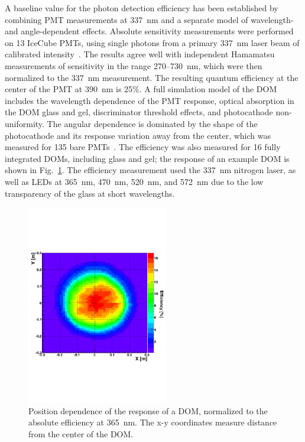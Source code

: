 A baseline value for the photon detection efficiency has been established
by combining PMT measurements at 337~nm and a separate model of wavelength-
and angle-dependent effects.  Absolute sensitivity measurements were
performed on 13 IceCube PMTs, using single photons from a primary 337~nm laser beam of calibrated
intensity~\cite{ICECUBE:PMT}. The results agree well with independent
Hamamatsu measurements of sensitivity in the range 270--730~nm, which
were then normalized to the 337~nm measurement.  The resulting quantum
efficiency at the center of the PMT at 390~nm is 25\%.  A full
simulation model of the DOM includes the wavelength dependence of the PMT
response, optical absorption in the DOM glass and gel, discriminator
threshold effects, and photocathode non-uniformity.  The angular dependence is
dominated by the shape of the photocathode and its response variation away
from the center, which was measured for 135 bare
PMTs~\cite{ICECUBE:PMT}. The efficiency was also measured for 16 fully integrated
DOMs, including glass and gel; the response of an example DOM is shown
in Fig.~\ref{fig:goldendom}. The efficiency measurement used the
337~nm nitrogen laser, as well as LEDs at 365~nm, 470~nm, 520~nm, and
572~nm due to the low transparency of the glass at short wavelengths.

\begin{figure}[!h]
 \centering
 \includegraphics[width=0.55\textwidth]{graphics/dom/performance/GDOM-NemuriNeko-2D-colz.pdf}
 \caption{Position dependence of the response of a DOM, normalized to
   the absolute efficiency at 365~nm. The x-y coordinates measure
   distance from the center of the DOM.}
 \label{fig:goldendom}
\end{figure}

